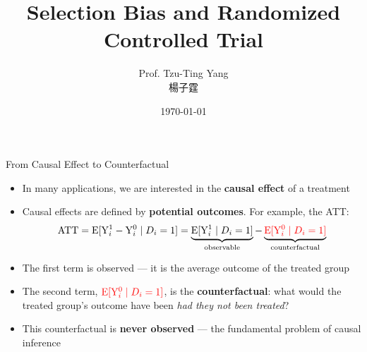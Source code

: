 \documentclass[hyperref={pdfpagelabels=false}]{beamer}
\title[Selection Bias \& RCT]{Selection Bias and Randomized Controlled Trial}
\author{Prof. Tzu-Ting Yang \\ 楊子霆}
\institute{Institute of Economics, Academia Sinica \\ 中央研究院經濟研究所}
\date{\today}
\begin{document}
	
	\begin{frame}{}
		\titlepage
	\end{frame}
	
\begin{frame}{From Causal Effect to Counterfactual}
	\begin{itemize}
		\item In many applications, we are interested in the \textbf{causal effect} of a treatment
		\vspace{0.3cm}
		\item Causal effects are defined by \textbf{potential outcomes}. For example, the ATT:
		\begin{equation*}
			\text{ATT} = \mathrm{E}[\mathrm{Y}^{1}_{i} - \mathrm{Y}^{0}_{i} \mid D_i = 1]
			= \underbrace{\mathrm{E}[\mathrm{Y}^{1}_{i} \mid D_i=1]}_{\text{observable}} - \underbrace{{\color{red}\mathrm{E}[\mathrm{Y}^{0}_{i} \mid D_i=1]}}_{\text{counterfactual}}
		\end{equation*}
		\vspace{0.2cm}
		\item The first term is observed --- it is the average outcome of the treated group
		\vspace{0.3cm}
		\item The second term, ${\color{red}\mathrm{E}[\mathrm{Y}^{0}_{i} \mid D_i=1]}$, is the \textbf{counterfactual}: what would the treated group's outcome have been \emph{had they not been treated}?
		\vspace{0.3cm}
		\item This counterfactual is \textbf{never observed} --- the fundamental problem of causal inference
	\end{itemize}
\end{frame}
\end{document}
